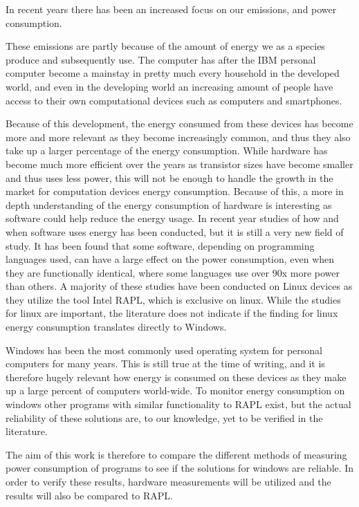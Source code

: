 In recent years there has been an increased focus on our emissions, and power consumption.

These emissions are partly because of the amount of energy we as a species produce and subsequently use. 
The computer has after the IBM personal computer become a mainstay in pretty much every household in the developed world, and even in the developing world an increasing amount of people have access to their own computational devices such as computers and smartphones\cite{DevelopedWorldPC}. 

Because of this development, the energy consumed from these devices has become more and more relevant as they become increasingly common, and thus they also take up a larger percentage of the energy consumption. 
While hardware has become much more efficient over the years as transistor sizes have become smaller and thus uses less power, this will not be enough to handle the growth in the market for computation devices energy consumption. Because of this, a more in depth understanding of the energy consumption of hardware is interesting as software could help reduce the energy usage\cite{somavat2011energy}. 
In recent year studies of how and when software uses energy has been conducted, but it is still a very new field of study. It has been found that some software, depending on programming languages used, can have a large effect on the power consumption, even when they are functionally identical, where some languages use over 90x more power than others.
A majority of these studies have been conducted on Linux devices as they utilize the tool Intel RAPL, which is exclusive on linux. While the studies for linux are important, the literature does not indicate if the finding for linux energy consumption translates directly to Windows\cite{pereira2017energy}. 

Windows has been the most commonly used operating system for personal computers for many years. This is still true at the time of writing, and it is therefore hugely relevant how energy is consumed on these devices as they make up a large percent of computers world-wide\cite{OSShare}. To monitor energy consumption on windows other programs with similar functionality to RAPL exist, but the actual reliability of these solutions are, to our knowledge, yet to be verified in the literature.

The aim of this work is therefore to compare the different methods of measuring power consumption of programs to see if the solutions for windows are reliable. 
In order to verify these results, hardware measurements will be utilized and the results will also be compared to RAPL.

